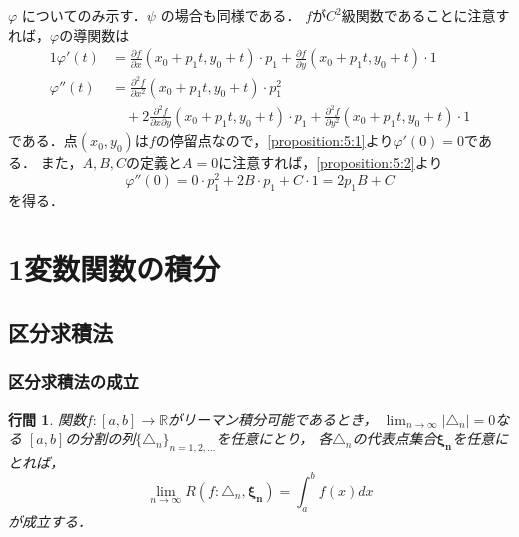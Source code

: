 \documentclass{jsarticle}
\makeatletter
\renewenvironment{proof}[1][\proofname]{\par
        \pushQED{\qed}
        \normalfont
        \topsep6\p@\@plus6\p@ \trivlist
        \item[\hskip\labelsep{\bfseries #1}\@addpunct{\bfseries}]\ignorespaces
    }{%
        \popQED\endtrivlist\@endpefalse
    }
\renewcommand{\proofname}{\underline{証明.}}
\newtheorem{proposition}{行間}
\makeatother
\begin{document}
\begin{proof}
    $\varphi$ についてのみ示す．$\psi$ の場合も同様である．
    $f$が$C^2$級関数であることに注意すれば，$\varphi$の導関数は
    \begin{alignat}{1}
        \varphi'(t)
        &=
              \frac{\partial f}{\partial x}(x_0 + p_1 t, y_0 + t) \cdot p_1
            + \frac{\partial f}{\partial y}(x_0 + p_1 t, y_0 + t) \cdot 1 \label{proposition:5:1} \\
        \varphi''(t)
        &=
              \frac{\partial^2 f}{\partial x^2}(x_0 + p_1 t, y_0 + t) \cdot p_1^2 \nonumber \\
        &\quad +
            2 \frac{\partial^2 f}{\partial x \partial y}(x_0 + p_1 t, y_0 + t) \cdot p_1
            + \frac{\partial^2 f}{\partial y^2}(x_0 + p_1 t, y_0 + t) \cdot 1 \label{proposition:5:2}
    \end{alignat}
    である．点$(x_0, y_0)$は$f$の停留点なので，\cref{proposition:5:1}より$\varphi'(0) = 0$である．
    また，$A, B, C$の定義と$A = 0$に注意すれば，\cref{proposition:5:2}より
    \begin{equation}
        \varphi''(0) = 0 \cdot p_1^2 + 2B \cdot p_1 + C \cdot 1 = 2p_1 B + C
    \end{equation}
    を得る．
\end{proof}

\section{1変数関数の積分}
\setcounter{subsection}{1}
\subsection{区分求積法}
\subsubsection{区分求積法の成立}
\begin{screen}
    \begin{proposition}
        関数$f:[a,b] \rightarrow \mathbb{R}$がリーマン積分可能であるとき，
        $\lim_{n\rightarrow\infty} |\triangle_n| = 0$なる
        $[a, b]$の分割の列$\{\triangle_n\}_{n=1,2,\dots}$を任意にとり，
        各$\triangle_n$の代表点集合$\mathbf{\xi_n}$を任意にとれば，
        \begin{equation}
            \lim_{n\rightarrow\infty} R(f: \triangle_n, \mathbf{\xi_n})
            =
            \int_a^b f(x) dx
        \end{equation}
        が成立する．
    \end{proposition}
\end{screen}
\end{document}

